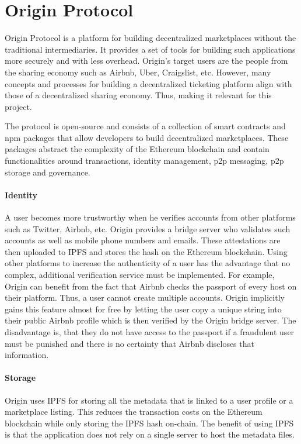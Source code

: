 
\section{Origin Protocol}
Origin Protocol \cite{origin-protocol-whitepaper} is a platform for building decentralized marketplaces without the traditional intermediaries. It provides a set of tools for building such applications more securely and with less overhead. Origin's target users are the people from the sharing economy such as Airbnb, Uber, Craigslist, etc. However, many concepts and processes for building a decentralized ticketing platform align with those of a decentralized sharing economy. Thus, making it relevant for this project.

The protocol is open-source and consists of a collection of smart contracts and npm packages that allow developers to build decentralized marketplaces. These packages abstract the complexity of the Ethereum blockchain and contain functionalities around transactions, identity management, p2p messaging, p2p storage and governance.


\paragraph{Identity}
A user becomes more trustworthy when he verifies accounts from other platforms such as Twitter, Airbnb, etc. Origin provides a bridge server who validates such accounts as well as mobile phone numbers and emails. These attestations are then uploaded to IPFS and stores the hash on the Ethereum blockchain. 
Using other platforms to increase the authenticity of a user has the advantage that no complex, additional verification service must be implemented. 
For example, Origin can benefit from the fact that Airbnb checks the passport of every host on their platform. Thus, a user cannot create multiple accounts. Origin implicitly gains this feature almost for free by letting the user copy a unique string into their public Airbnb profile which is then verified by the Origin bridge server.
The disadvantage is, that they do not have access to the passport if a fraudulent user must be punished and there is no certainty that Airbnb discloses that information.


\paragraph{Storage}
Origin uses IPFS for storing all the metadata that is linked to a user profile or a marketplace listing. This reduces the transaction costs on the Ethereum blockchain while only storing the IPFS hash on-chain. The benefit of using IPFS is that the application does not rely on a single server to host the metadata files. 

